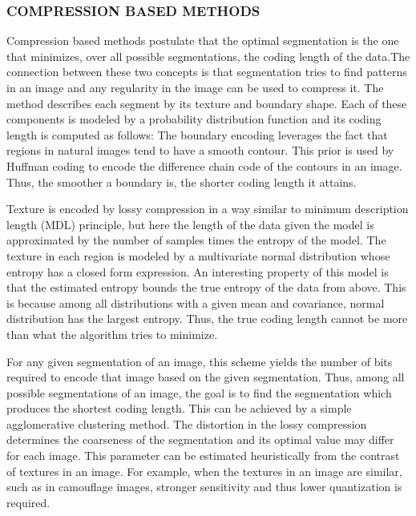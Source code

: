 \subsubsection{COMPRESSION BASED METHODS}
Compression based methods postulate that the optimal segmentation is the one that minimizes, over all possible segmentations, the coding length of the data.The connection between these two concepts is that segmentation tries to find patterns in an image and any regularity in the image can be used to compress it. The method describes each segment by its texture and boundary shape. Each of these components is modeled by a probability distribution function and its coding length is computed as follows:
The boundary encoding leverages the fact that regions in natural images tend to have a smooth contour. This prior is used by Huffman coding to encode the difference chain code of the contours in an image. Thus, the smoother a boundary is, the shorter coding length it attains.

Texture is encoded by lossy compression in a way similar to minimum description length (MDL) principle, but here the length of the data given the model is approximated by the number of samples times the entropy of the model. The texture in each region is modeled by a multivariate normal distribution whose entropy has a closed form expression. An interesting property of this model is that the estimated entropy bounds the true entropy of the data from above. This is because among all distributions with a given mean and covariance, normal distribution has the largest entropy. Thus, the true coding length cannot be more than what the algorithm tries to minimize.

For any given segmentation of an image, this scheme yields the number of bits required to encode that image based on the given segmentation. Thus, among all possible segmentations of an image, the goal is to find the segmentation which produces the shortest coding length. This can be achieved by a simple agglomerative clustering method. The distortion in the lossy compression determines the coarseness of the segmentation and its optimal value may differ for each image. This parameter can be estimated heuristically from the contrast of textures in an image. For example, when the textures in an image are similar, such as in camouflage images, stronger sensitivity and thus lower quantization is required.

